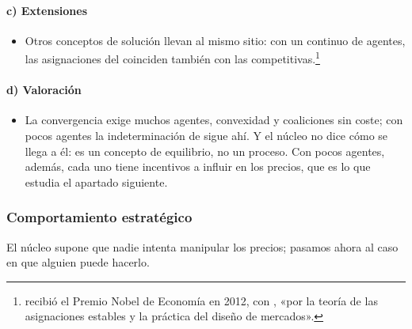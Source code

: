 \documentclass[11pt]{article}
\begin{document}
\paragraph{c) Extensiones}

\begin{itemize}
\item Otros conceptos de solución llevan al mismo sitio: con un continuo de agentes, las asignaciones del  coinciden también con las competitivas\nocite{Aumann1975Values}.\footnote{ recibió el Premio Nobel de Economía en 2012, con , «por la teoría de las asignaciones estables y la práctica del diseño de mercados»\nocite{Nobel2012RothShapley}.}
\end{itemize}

\paragraph{d) Valoración}

\begin{itemize}
\item La convergencia exige muchos agentes, convexidad y coaliciones sin coste; con pocos agentes la indeterminación de  sigue ahí. Y el núcleo no dice cómo se llega a él: es un concepto de equilibrio, no un proceso. Con pocos agentes, además, cada uno tiene incentivos a influir en los precios, que es lo que estudia el apartado siguiente.
\end{itemize}

\subsubsection{Comportamiento estratégico}\label{sec:comportamiento-estrategico}

El núcleo supone que nadie intenta manipular los precios; pasamos ahora al caso en que alguien puede hacerlo.
\end{document}
